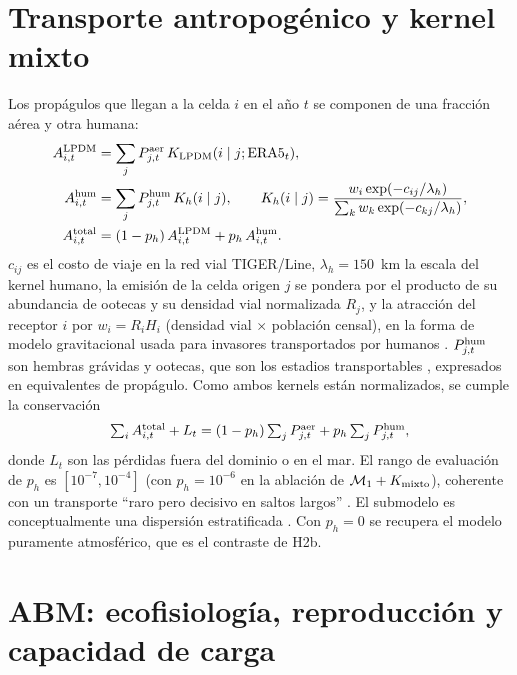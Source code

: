 \documentclass[11pt,letterpaper]{article}
\begin{document}
\section{Transporte antropogénico y kernel mixto}
\label{sec:kmixto}
Los propágulos que llegan a la celda $i$ en el año $t$ se componen de una fracción aérea y otra humana:
\begin{align}
A^{\rm LPDM}_{i,t}&=\sum_j P^{\rm aer}_{j,t}\,K_{\rm LPDM}(i\mid j;\mathrm{ERA5}_t),\\
A^{\rm hum}_{i,t}&=\sum_j P^{\rm hum}_{j,t}\,K_h(i\mid j),\qquad
K_h(i\mid j)=\frac{w_i\exp(-c_{ij}/\lambda_h)}{\sum_k w_k\exp(-c_{kj}/\lambda_h)},\\
A^{\rm total}_{i,t}&=(1-p_h)\,A^{\rm LPDM}_{i,t}+p_h\,A^{\rm hum}_{i,t}.\label{eq:atot}
\end{align}
$c_{ij}$ es el costo de viaje en la red vial TIGER/Line, $\lambda_h=150$~km la escala del kernel humano, la emisión de la celda origen $j$ se pondera por el producto de su abundancia de ootecas y su densidad vial normalizada $R_j$, y la atracción del receptor $i$ por $w_i=R_iH_i$ (densidad vial $\times$ población censal), en la forma de modelo gravitacional usada para invasores transportados por humanos \cite{bossenbroek2001,gippet2019}. $P^{\rm hum}_{j,t}$ son hembras grávidas y ootecas, que son los estadios transportables \cite{chuang2023,hoebeke2015}, expresados en equivalentes de propágulo. Como ambos kernels están normalizados, se cumple la conservación
\begin{equation}\textstyle\sum_iA^{\rm total}_{i,t}+L_t=(1-p_h)\sum_jP^{\rm aer}_{j,t}+p_h\sum_jP^{\rm hum}_{j,t},\end{equation}
donde $L_t$ son las pérdidas fuera del dominio o en el mar. El rango de evaluación de $p_h$ es $[10^{-7},10^{-4}]$ (con $p_h=10^{-6}$ en la ablación de $\mathcal M_1+K_{\rm mixto}$), coherente con un transporte ``raro pero decisivo en saltos largos'' \cite{chuang2023}. El submodelo es conceptualmente una dispersión estratificada \cite{shigesada1997}. Con $p_h=0$ se recupera el modelo puramente atmosférico, que es el contraste de H2b.

\section{ABM: ecofisiología, reproducción y capacidad de carga}
\end{document}

